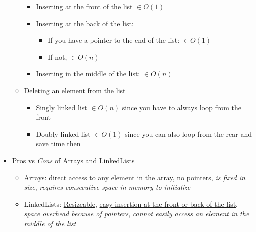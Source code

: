 \documentclass{article}
\begin{document}
\begin{itemize}
\begin{itemize}
                \begin{itemize}
                    \item Inserting at the front of the list $\in O(1)$
                    \item Inserting at the back of the list:
                        \begin{itemize}
                            \item If you have a pointer to the end of the list: $\in O(1)$
                            \item If not, $\in O(n)$
                        \end{itemize}
                    \item Inserting in the middle of the list: $\in O(n)$
                \end{itemize}
            \item Deleting an element from the list
                \begin{itemize}
                    \item Singly linked list $\in O(n)$ since you have to always loop from the front
                    \item Doubly linked list $\in O(1)$ since you can also loop from the rear and save time then
                \end{itemize}
        \end{itemize}
    \item \underline{Pros} vs \textit{Cons} of Arrays and LinkedLists
        \begin{itemize}
            \item Arrays: \underline{direct access to any element in the array}, \underline{no pointers}, \textit{is fixed in size}, \textit{requires consecutive space in memory to initialize}
            \item LinkedLists: \underline{Resizeable}, \underline{easy insertion at the front or back of the list}, \textit{space overhead because of pointers}, \textit{cannot easily access an element in the middle of the list}
        \end{itemize}
\end{itemize}
\end{document}
